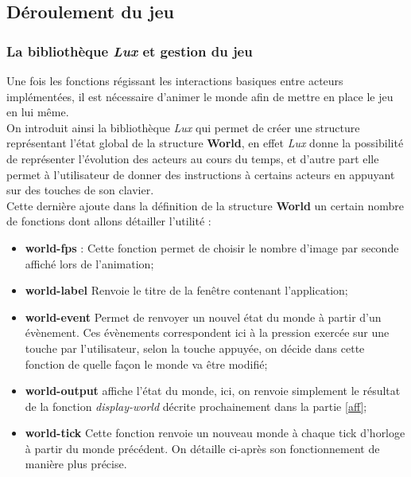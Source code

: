 \documentclass[a4paper,10pt]{article}
\begin{document}



\subsection{Déroulement du jeu}
\label{deroule}
\subsubsection{La bibliothèque \emph{Lux} et gestion du jeu}
Une fois les fonctions régissant les interactions basiques entre acteurs implémentées, il est nécessaire d'animer le monde afin de mettre en place le jeu en lui même. \\
On introduit ainsi la bibliothèque \emph{Lux} qui permet de créer une structure représentant l’état global de la structure \textbf{World}, en effet \emph{Lux} donne la possibilité de représenter l’évolution des acteurs au cours du temps, et d’autre part elle permet à l’utilisateur de donner des instructions à certains acteurs en appuyant sur des touches de son clavier.\\
Cette dernière ajoute dans la définition de la structure \textbf{World} un certain nombre de fonctions dont allons détailler l'utilité  : \\
\begin{itemize}
    \item \textbf{world-fps} : Cette fonction permet de choisir le nombre d'image par seconde affiché lors de l'animation; \\
    \item \textbf{world-label} Renvoie le titre de la fenêtre contenant l'application; \\
    \item \textbf{world-event} Permet de renvoyer un nouvel état du monde à partir d'un évènement. Ces évènements correspondent ici à la pression exercée sur une touche par l'utilisateur, selon la touche appuyée, on décide dans cette fonction de quelle façon le monde va être modifié; \\
    \item \textbf{world-output} affiche l'état du monde, ici, on renvoie simplement le résultat de la fonction \textit{display-world} décrite prochainement dans la partie \ref{aff}; \\
    \item \textbf{world-tick} Cette fonction renvoie un nouveau monde à chaque tick d'horloge à partir du monde précédent. On détaille ci-après son fonctionnement de manière plus précise. \\
\end{itemize}
\end{document}
